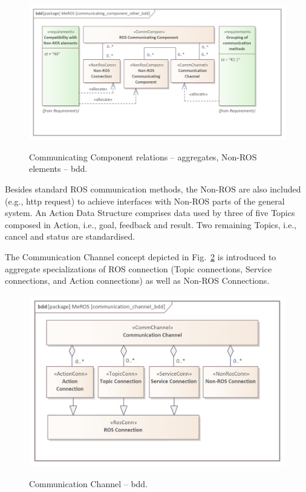 \documentclass[11pt,oneside,a4paper]{article}
\begin{document}
	\begin{figure}[H]
		\centering
		\begin{center}
			{\includegraphics[scale=1.0]{img/meros_pkg/communicating_component_other_bdd.png}}
		\end{center}
		\caption{Communicating Component relations -- aggregates, Non-ROS elements -- bdd.} 
		\label{fig:communicating_component_other_bdd}
	\end{figure}
	
	Besides standard ROS communication methods, the Non-ROS are also included (e.g., http request) to achieve interfaces with Non-ROS parts of the general system. An Action Data Structure comprises data used by three of five Topics composed in Action, i.e., goal, feedback and result. Two remaining Topics, i.e., cancel and status are standardised.
	
	\pagebreak
	
	 The Communication Channel \cite{palka2022communication} concept depicted in Fig.~\ref{fig:communication_channel_bdd} is introduced to aggregate specializations of ROS connection (Topic connections, Service connections, and Action connections) as well as Non-ROS Connections. 
	 
  
 	\begin{figure}[H]
	 	\centering
	 	\begin{center}
	 		{\includegraphics[scale=1.0]{img/meros_pkg/communication_channel_bdd.png}}
	 	\end{center}
	 	\caption{Communication Channel -- bdd.} 
	 	\label{fig:communication_channel_bdd}
	 \end{figure}
	 
\end{document}
